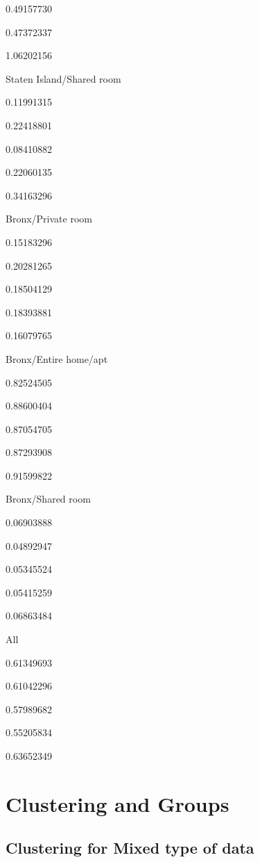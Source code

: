 \documentclass[
]{article}
\begin{document}
0.49157730

0.47372337

1.06202156

Staten Island/Shared room

0.11991315

0.22418801

0.08410882

0.22060135

0.34163296

Bronx/Private room

0.15183296

0.20281265

0.18504129

0.18393881

0.16079765

Bronx/Entire home/apt

0.82524505

0.88600404

0.87054705

0.87293908

0.91599822

Bronx/Shared room

0.06903888

0.04892947

0.05345524

0.05415259

0.06863484

All

0.61349693

0.61042296

0.57989682

0.55205834

0.63652349

\hypertarget{clustering-and-groups}{%
\section{Clustering and Groups}\label{clustering-and-groups}}

\hypertarget{clustering-for-mixed-type-of-data}{%
\subsection{Clustering for Mixed type of
data}\label{clustering-for-mixed-type-of-data}}
\end{document}
